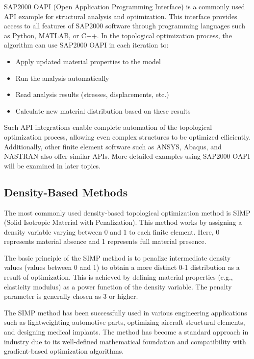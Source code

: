 SAP2000 OAPI (Open Application Programming Interface) is a commonly used API example for structural analysis and optimization. This interface provides access to all features of SAP2000 software through programming languages such as Python, MATLAB, or C++. In the topological optimization process, the algorithm can use SAP2000 OAPI in each iteration to:

\begin{itemize}
    \item Apply updated material properties to the model
    \item Run the analysis automatically
    \item Read analysis results (stresses, displacements, etc.)
    \item Calculate new material distribution based on these results
\end{itemize}

Such API integrations enable complete automation of the topological optimization process, allowing even complex structures to be optimized efficiently. Additionally, other finite element software such as ANSYS, Abaqus, and NASTRAN also offer similar APIs. More detailed examples using SAP2000 OAPI will be examined in later topics.

\subsection{Density-Based Methods}
The most commonly used density-based topological optimization method is SIMP (Solid Isotropic Material with Penalization). This method works by assigning a density variable varying between 0 and 1 to each finite element. Here, 0 represents material absence and 1 represents full material presence.

The basic principle of the SIMP method is to penalize intermediate density values (values between 0 and 1) to obtain a more distinct 0-1 distribution as a result of optimization. This is achieved by defining material properties (e.g., elasticity modulus) as a power function of the density variable. The penalty parameter is generally chosen as 3 or higher.

The SIMP method has been successfully used in various engineering applications such as lightweighting automotive parts, optimizing aircraft structural elements, and designing medical implants. The method has become a standard approach in industry due to its well-defined mathematical foundation and compatibility with gradient-based optimization algorithms.

